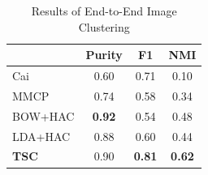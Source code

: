 
\begin{table}[th]
\centering
\caption{Results of End-to-End Image Clustering}
\small
\begin{tabular}{|l|c|c|c|}
\hline
           &  Purity &    F1 &   NMI  \\
\hline
  Cai &      0.60  &      0.71  &      0.10   \\
\hline
 MMCP &      0.74  &      0.58  &      0.34   \\
\hline
 BOW+HAC &     {\bf 0.92}  &      0.54  &      0.48   \\
\hline
 LDA+HAC & 0.88 & 0.60 & 0.44\\
\hline
{\bf TSC} &      0.90  &    {\bf 0.81}  &    {\bf 0.62}   \\
\hline
\end{tabular}
\label{tab:end2end}
\vspace{-2mm}
\end{table}

